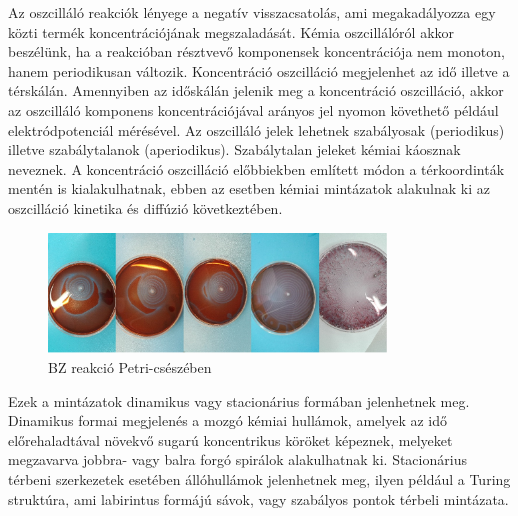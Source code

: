 Az oszcilláló reakciók lényege a negatív visszacsatolás, ami megakadályozza egy közti termék koncentrációjának megszaladását.
Kémia oszcillálóról akkor beszélünk, ha a reakcióban résztvevő komponensek koncentrációja nem monoton, hanem periodikusan változik. Koncentráció oszcilláció megjelenhet az idő illetve a térskálán. Amennyiben az időskálán jelenik meg a koncentráció oszcilláció, akkor az oszcilláló komponens koncentrációjával arányos jel nyomon követhető például elektródpotenciál mérésével.
Az oszcilláló jelek lehetnek szabályosak (periodikus) illetve szabálytalanok (aperiodikus). Szabálytalan jeleket kémiai káosznak neveznek. A koncentráció oszcilláció előbbiekben említett módon a térkoordinták mentén is kialakulhatnak, ebben az esetben kémiai mintázatok alakulnak ki az oszcilláció kinetika és diffúzió következtében.\\

\begin{figure}[h]
\centering
\includegraphics[width=0.8\textwidth]{img/oscillating_reaction.jpg}
\caption{BZ reakció Petri-csészében}
\label{fig:ionophores}
\end{figure}

Ezek a mintázatok dinamikus vagy stacionárius formában jelenhetnek meg.
Dinamikus formai megjelenés a mozgó kémiai hullámok, amelyek az idő előrehaladtával növekvő sugarú koncentrikus köröket képeznek, melyeket megzavarva jobbra- vagy balra forgó spirálok alakulhatnak ki.
Stacionárius térbeni szerkezetek esetében állóhullámok jelenhetnek meg, ilyen például a Turing struktúra, ami labirintus formájú sávok, vagy szabályos pontok térbeli mintázata.

